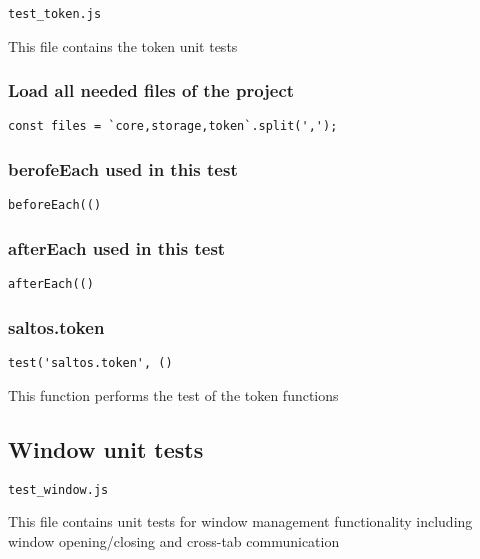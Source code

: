 \documentclass[a4paper]{article}
\begin{document}
\begin{lstlisting}
test_token.js
\end{lstlisting}

This file contains the token unit tests

\hypertarget{toc714}{}
\subsubsection{Load all needed files of the project}

\begin{lstlisting}
const files = `core,storage,token`.split(',');
\end{lstlisting}

\hypertarget{toc715}{}
\subsubsection{berofeEach used in this test}

\begin{lstlisting}
beforeEach(()
\end{lstlisting}

\hypertarget{toc716}{}
\subsubsection{afterEach used in this test}

\begin{lstlisting}
afterEach(()
\end{lstlisting}

\hypertarget{toc717}{}
\subsubsection{saltos.token}

\begin{lstlisting}
test('saltos.token', ()
\end{lstlisting}

This function performs the test of the token functions

\hypertarget{toc718}{}
\subsection{Window unit tests}

\begin{lstlisting}
test_window.js
\end{lstlisting}

This file contains unit tests for window management functionality
including window opening/closing and cross-tab communication
\end{document}
